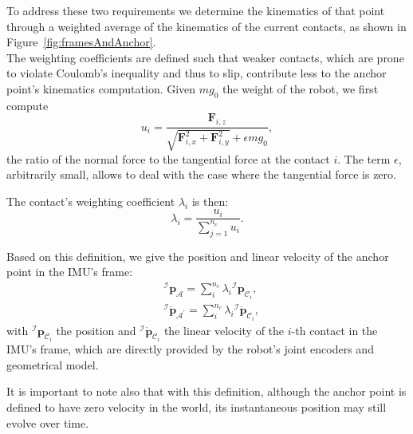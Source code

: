 \documentclass{IJCAS}
\begin{document}
To address these two requirements we determine the kinematics of that point through a weighted average of the kinematics of the current contacts, as shown in Figure~\ref{fig:framesAndAnchor}.  \\
The weighting coefficients are defined such that weaker contacts, which are prone to violate Coulomb's inequality and thus to slip, contribute less to the anchor point's kinematics computation. Given $mg_{0}$ the weight of the robot, we first compute 
\begin{equation}
    u_{i} = \frac{\boldsymbol{F}_{i,z}}{\sqrt{\boldsymbol{F}_{i,x}^2 + \boldsymbol{F}_{i,y}^2} + \epsilon mg_{0}}, \label{eq:ratio_ui}
\end{equation}
the ratio of the normal force to the tangential force at the contact $i$. The term $\epsilon$, arbitrarily small, allows to deal with the case where the tangential force is zero.

The contact's weighting coefficient $\lambda_{i}$ is then:
\begin{equation}
    \lambda_{i}=\frac{u_{i}}{\sum^{n_{c}}_{j=1}u_{i}}.
\end{equation}

Based on this definition, we give the position and linear velocity of the anchor point in the IMU's frame:
\begin{align} 
&{^{\mathcal{I}}}\boldsymbol{p}_{\mathcal{A}} = \sum^{n_{c}}_{i} \lambda_{i}  {^{\mathcal{I}}} \boldsymbol{p}_{{\mathcal{C}}_{i}}, \label{eq:imuAnchorPos} \\
&{^{\mathcal{I}}} \dot{\boldsymbol{p}}_{\mathcal{A}^{\prime}} = \sum^{n_{c}}_{i} \lambda_{i}  {^{\mathcal{I}}} \dot{\boldsymbol{p}}_{{\mathcal{C}}_{i}}, \label{eq:imuAnchorVel}
\end{align} 
with ${^{\mathcal{I}}} \boldsymbol{p}_{{\mathcal{C}}_{i}}$ the position and ${^{\mathcal{I}}} \dot{\boldsymbol{p}}_{{\mathcal{C}}_{i}}$ the linear velocity of the $i$-th contact in the IMU's frame, which are directly provided by the robot's joint encoders and geometrical model.

It is important to note also that with this definition, although the anchor point is defined to have zero velocity in the world, its instantaneous position may still evolve over time.
\end{document}
